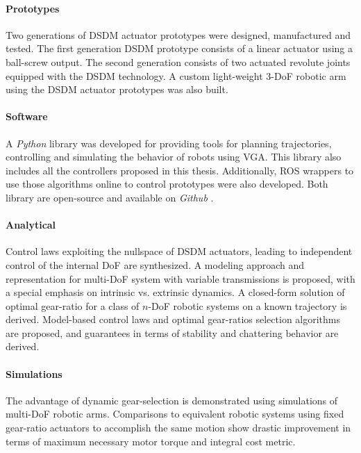 \paragraph{Prototypes}
%
Two generations of DSDM actuator prototypes were designed, manufactured and tested. The first generation DSDM prototype consists of a linear actuator using a ball-screw output. The second generation consists of two actuated revolute joints equipped with the DSDM technology. A custom light-weight 3-DoF robotic arm using the DSDM actuator prototypes was also built. %

\paragraph{Software}
%
A \emph{Python} library was developed for providing tools for planning trajectories, controlling and simulating the behavior of robots using VGA. This library also includes all the controllers proposed in this thesis. Additionally, ROS wrappers to use those algorithms online to control prototypes were also developed. Both library are open-source and available on \emph{Github} \cite{girard_github.com/alx87grd/alexrobotics_2017}\cite{girard_github.com/alx87grd/dsdm_robotics_ros_2017}.


\paragraph{Analytical}
%
Control laws exploiting the nullspace of DSDM actuators, leading to independent control of the internal DoF are synthesized. A modeling approach and representation for multi-DoF system with variable transmissions is proposed, with a special emphasis on intrinsic vs. extrinsic dynamics. A closed-form solution of optimal gear-ratio for a class of $n$-DoF robotic systems on a known trajectory is derived. Model-based control laws and optimal gear-ratios selection algorithms are proposed, and guarantees in terms of stability and chattering behavior are derived.

\paragraph{Simulations}
%
The advantage of dynamic gear-selection is demonstrated using simulations of multi-DoF robotic arms. Comparisons to equivalent robotic systems using fixed gear-ratio actuators to accomplish the same motion show drastic improvement in terms of maximum necessary motor torque and integral cost metric. 

